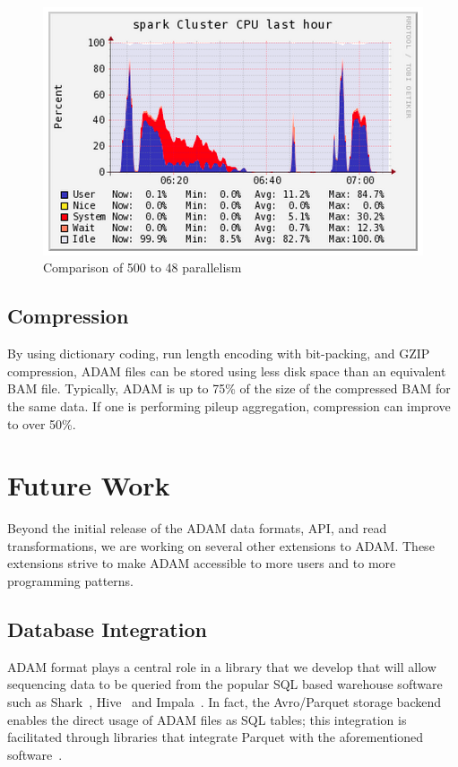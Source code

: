 \documentclass[10pt,twocolumn]{article}
\theoremstyle{plain}
\begin{document}
\begin{figure}[h]
\begin{center}
\includegraphics[width=0.9\linewidth]{images/Ganglia CPU Graph.png}
\end{center}
\caption{Comparison of 500 to 48 parallelism}
\label{fig:parallelism}
\end{figure}

\subsection{Compression}
\label{sec:compression}

By using dictionary coding, run length encoding with bit-packing, and GZIP compression, ADAM files can be stored using less
disk space than an equivalent BAM file. Typically, ADAM is up to 75\% of the size of the compressed BAM for the
same data. If one is performing pileup aggregation, compression can improve to over 50\%.

\section{Future Work}
\label{sec:future-work}

Beyond the initial release of the ADAM data formats, API, and read transformations, we are working on several other
extensions to ADAM. These extensions strive to make ADAM accessible to more users and to more programming patterns.

\subsection{Database Integration}
\label{sec:database-integration}

ADAM format plays a central role in a library that we develop that will allow sequencing data to be queried from 
the popular SQL based warehouse software such as Shark~\cite{shark}, Hive~\cite{hive} and Impala~\cite{impala}. In fact,
the Avro/Parquet storage backend enables the direct usage of ADAM files as SQL tables; this integration is facilitated through libraries 
that integrate Parquet with the aforementioned software~\cite{parquet}.
\end{document}
